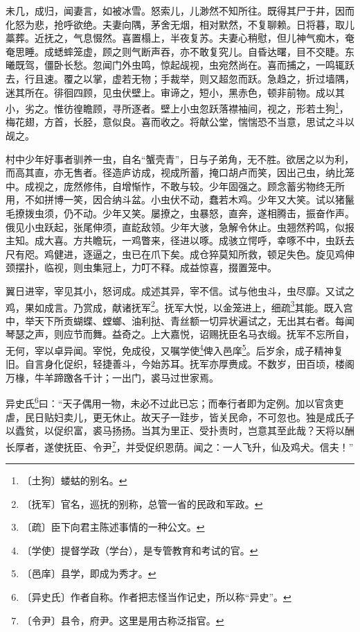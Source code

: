 \documentclass[12pt,UTF-8,openany]{ctexbook}
\begin{document}
\begin{normalsize}
    未几，成归，闻妻言，如被冰雪。怒索儿，儿渺然不知所往。既得其尸于井，因而化怒为悲，抢呼欲绝。夫妻向隅，茅舍无烟，相对默然，不复聊赖。日将暮，取儿藁葬。近抚之，气息惙然。喜置榻上，半夜复苏。夫妻心稍慰，但儿神气痴木，奄奄思睡。成蟋蟀笼虚，顾之则气断声吞，亦不敢复究儿。自昏达曙，目不交睫。东曦既驾，僵卧长愁。忽闻门外虫鸣，惊起觇视，虫宛然尚在。喜而捕之，一鸣辄跃去，行且速。覆之以掌，虚若无物；手裁举，则又超忽而跃。急趋之，折过墙隅，迷其所在。徘徊四顾，见虫伏壁上。审谛之，短小，黑赤色，顿非前物。成以其小，劣之。惟彷徨瞻顾，寻所逐者。壁上小虫忽跃落襟袖间，视之，形若土狗\footnote{〔土狗〕蝼蛄的别名。}，梅花翅，方首，长胫，意似良。喜而收之。将献公堂，惴惴恐不当意，思试之斗以觇之。
    
    村中少年好事者驯养一虫，自名“蟹壳青”，日与子弟角，无不胜。欲居之以为利，而高其直，亦无售者。径造庐访成，视成所蓄，掩口胡卢而笑，因出己虫，纳比笼中。成视之，庞然修伟，自增惭怍，不敢与较。少年固强之。顾念蓄劣物终无所用，不如拼博一笑，因合纳斗盆。小虫伏不动，蠢若木鸡。少年又大笑。试以猪鬣毛撩拨虫须，仍不动。少年又笑。屡撩之，虫暴怒，直奔，遂相腾击，振奋作声。俄见小虫跃起，张尾伸须，直龁敌领。少年大骇，急解令休止。虫翘然矜鸣，似报主知。成大喜。方共瞻玩，一鸡瞥来，径进以啄。成骇立愕呼，幸啄不中，虫跃去尺有咫。鸡健进，逐逼之，虫已在爪下矣。成仓猝莫知所救，顿足失色。旋见鸡伸颈摆扑，临视，则虫集冠上，力叮不释。成益惊喜，掇置笼中。
    
    翼日进宰，宰见其小，怒诃成。成述其异，宰不信。试与他虫斗，虫尽靡。又试之鸡，果如成言。乃赏成，献诸抚军\footnote{〔抚军〕官名，巡抚的别称，总管一省的民政和军政。}。抚军大悦，以金笼进上，细疏\footnote{〔疏〕臣下向君主陈述事情的一种公文。}其能。既入宫中，举天下所贡蝴蝶、螳螂、油利挞、青丝额一切异状遍试之，无出其右者。每闻琴瑟之声，则应节而舞。益奇之。上大嘉悦，诏赐抚臣名马衣缎。抚军不忘所自，无何，宰以卓异闻。宰悦，免成役，又嘱学使\footnote{〔学使〕提督学政（学台），是专管教育和考试的官。}俾入邑庠\footnote{〔邑庠〕县学，即成为秀才。}。后岁余，成子精神复旧。自言身化促织，轻捷善斗，今始苏耳。抚军亦厚赉成。不数岁，田百顷，楼阁万椽，牛羊蹄躈各千计；一出门，裘马过世家焉。
    
    异史氏\footnote{〔异史氏〕作者自称。作者把志怪当作记史，所以称“异史”。}曰：“天子偶用一物，未必不过此已忘；而奉行者即为定例。加以官贪吏虐，民日贴妇卖儿，更无休止。故天子一跬步，皆关民命，不可忽也。独是成氏子以蠹贫，以促织富，裘马扬扬。当其为里正、受扑责时，岂意其至此哉？天将以酬长厚者，遂使抚臣、令尹\footnote{〔令尹〕县令，府尹。这里是用古称泛指官。}，并受促织恩荫。闻之：一人飞升，仙及鸡犬。信夫！”
\end{normalsize}
\end{document}

